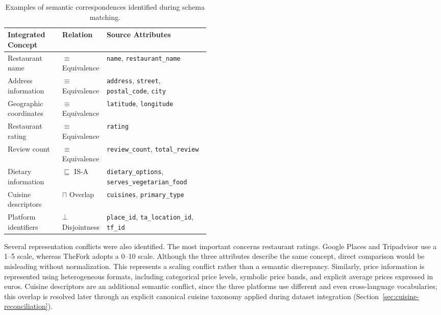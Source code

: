 \begin{table}[t]
\centering
\footnotesize
\setlength{\tabcolsep}{4pt}
\begin{tabularx}{\linewidth}{@{}
>{\RaggedRight\arraybackslash}p{0.27\linewidth}
>{\RaggedRight\arraybackslash}p{0.19\linewidth}
>{\RaggedRight\arraybackslash}X
@{}}
\toprule
\textbf{Integrated Concept} & \textbf{Relation} & \textbf{Source Attributes} \\
\midrule
Restaurant name & $\equiv$ Equivalence & \texttt{name}, \texttt{restaurant\_name} \\
Address information & $\equiv$ Equivalence & \texttt{address}, \texttt{street}, \texttt{postal\_code}, \texttt{city} \\
Geographic coordinates & $\equiv$ Equivalence & \texttt{latitude}, \texttt{longitude} \\
Restaurant rating & $\equiv$ Equivalence & \texttt{rating} \\
Review count & $\equiv$ Equivalence & \texttt{review\_count}, \texttt{total\_review} \\
Dietary information & $\sqsubseteq$ IS-A & \texttt{dietary\_options}, \texttt{serves\_vegetarian\_food} \\
Cuisine descriptors & $\sqcap$ Overlap & \texttt{cuisines}, \texttt{primary\_type} \\
Platform identifiers &
$\bot$ Disjointness &
\texttt{place\_id}, \texttt{ta\_location\_id}, \texttt{tf\_id}
\\
\bottomrule
\end{tabularx}
\caption{Examples of semantic correspondences identified during schema matching.}
\label{tab:schema-matching-correspondences}
\end{table}

Several representation conflicts were also identified. The most important concerns restaurant ratings. Google Places and Tripadvisor use a 1--5 scale, whereas TheFork adopts a 0--10 scale. Although the three attributes describe the same concept, direct comparison would be misleading without normalization. This represents a scaling conflict rather than a semantic discrepancy. Similarly, price information is represented using heterogeneous formats, including categorical price levels, symbolic price bands, and explicit average prices expressed in euros. Cuisine descriptors are an additional semantic conflict, since the three platforms use different and even cross-language vocabularies; this overlap is resolved later through an explicit canonical cuisine taxonomy applied during dataset integration (Section~\ref{sec:cuisine-reconciliation}).

